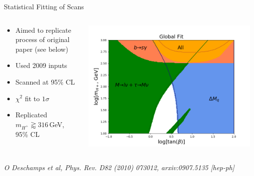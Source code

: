 \documentclass[10pt,xcolor={table,dvipsnames},t]{beamer}
\begin{document}
\begin{frame}{Statistical Fitting of Scans}
    \begin{columns}[T]
        \begin{column}{0.4\textwidth}
            \begin{itemize}
                \item Aimed to replicate process of original paper (see below) 
                \item Used 2009 inputs
                \item Scanned at 95\% CL
                \item $\chi^2$ fit to $1\sigma$
                \item Replicated $m_{H^+}\gtrapprox316\,$GeV, 95\% CL
            \end{itemize}
        \end{column}
        \begin{column}{0.55\textwidth}
            \vspace{-1.5em}
            \includegraphics[scale=0.35]{global_08}
        \end{column}
    \end{columns}
    \emph{\small O Deschamps et al, Phys. Rev. D82 (2010) 073012, arxiv:0907.5135 [hep-ph]}
\end{frame}
\end{document}
